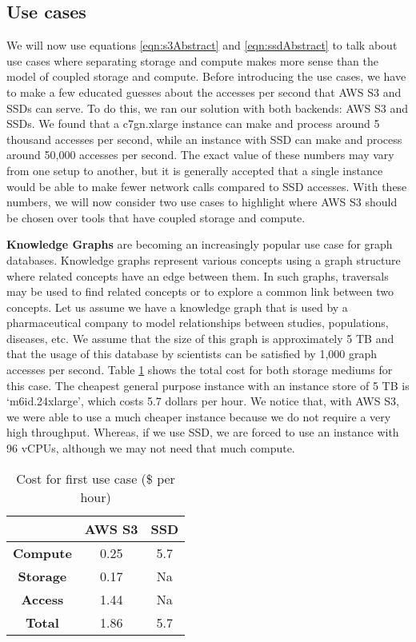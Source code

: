 \subsection{Use cases}
We will now use equations \ref{eqn:s3Abstract} and \ref{eqn:ssdAbstract} to talk
about use cases where separating storage and compute makes more sense than the
model of coupled storage and compute. Before introducing the use cases, we have
to make a few educated guesses about the accesses per second that AWS S3 and SSDs
can serve. To do this, we ran our solution with both backends: AWS S3 and SSDs.
We found that a c7gn.xlarge instance can make and process around 5
thousand accesses per second, while an instance with SSD can make and process
around 50,000  accesses per second. The exact value of these numbers may
vary from one setup to another, but it is generally accepted that a single
instance would be able to make fewer network calls compared to SSD accesses.
With these numbers, we will now consider two use cases to highlight where AWS S3
should be chosen over tools that have coupled storage and compute.

\medskip
\textbf{Knowledge Graphs} are becoming an increasingly popular use case for
graph databases. Knowledge graphs represent various concepts using a
graph structure where related concepts have an edge between them. In such
graphs, traversals may be used to find related concepts or to explore a common
link between two concepts. Let us assume we have a knowledge graph that is used
by a pharmaceutical company to model relationships between studies, populations,
diseases, etc. We assume that the size of this graph is approximately 5 TB and
that the usage of this database by scientists can be satisfied by 1,000
graph accesses per second. Table \ref{table:costKnowledgeGraphs} shows the total
cost for both storage mediums for this case. The cheapest general purpose
instance with an instance store of 5 TB is `m6id.24xlarge', which costs 5.7
dollars per hour. We notice that, with AWS S3, we were able to use a much
cheaper instance because we do not require a very high throughput. Whereas, if
we use SSD, we are forced to use an instance with 96 vCPUs, although we may
not need that much compute.

\begin{table}[h!]
 \centering
 \begin{tabular}{|c | c | c |} 
 \hline
  & AWS S3 & SSD \\ [0.5ex] 
 \hline\hline
     \textbf{Compute} & 0.25 & 5.7 \\ 
     \textbf{Storage} & 0.17 & Na \\
     \textbf{Access} &  1.44 & Na \\
     \hline
     \textbf{Total} & 1.86 & 5.7 \\
 \hline
 \end{tabular}
 \caption{Cost for first use case (\$ per hour)}
 \label{table:costKnowledgeGraphs}
\end{table}


